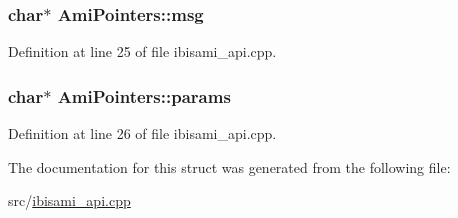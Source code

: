 \hypertarget{struct_ami_pointers_a4922e9e0eb86e7515c5d60a4be512657}{}
\subsubsection[{msg}]{\setlength{\rightskip}{0pt plus 5cm}char$\ast$ Ami\+Pointers\+::msg}\label{struct_ami_pointers_a4922e9e0eb86e7515c5d60a4be512657}


Definition at line 25 of file ibisami\+\_\+api.\+cpp.

\hypertarget{struct_ami_pointers_a4a71183d01dde25a4cb9fabb89ee6d01}{}
\subsubsection[{params}]{\setlength{\rightskip}{0pt plus 5cm}char$\ast$ Ami\+Pointers\+::params}\label{struct_ami_pointers_a4a71183d01dde25a4cb9fabb89ee6d01}


Definition at line 26 of file ibisami\+\_\+api.\+cpp.



The documentation for this struct was generated from the following file\+:\begin{DoxyCompactItemize}
\item 
src/\hyperlink{ibisami__api_8cpp}{ibisami\+\_\+api.\+cpp}\end{DoxyCompactItemize}
